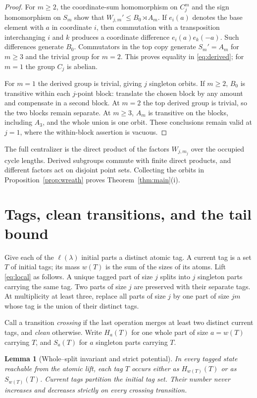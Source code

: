 \documentclass[10pt,a4paper]{amsart}
\newtheorem{lemma}[theorem]{Lemma}
\theoremstyle{definition}
\theoremstyle{remark}
\newcommand{\ellp}{\ell}
\begin{document}
\begin{proof}
For $m\geq2$, the coordinate-sum homomorphism on $C_j^m$ and the sign
homomorphism on $S_m$ show that
$W_{j,m}'\leq B_0\rtimes A_m$.  If $e_i(a)$ denotes the base element with
$a$ in coordinate $i$, then commutation with a transposition interchanging
$i$ and $k$ produces a coordinate difference
$e_i(a)e_k(-a)$.  Such differences generate $B_0$.  Commutators in the top
copy generate $S_m'=A_m$ for $m\geq3$ and the trivial group for $m=2$.
This proves equality in \eqref{eq:derived}; for $m=1$ the group $C_j$ is
abelian.

For $m=1$ the derived group is trivial, giving $j$ singleton orbits.  If
$m\geq2$, $B_0$ is transitive within each $j$-point block: translate the
chosen block by any amount and compensate in a second block.  At $m=2$ the
top derived group is trivial, so the two blocks remain separate.  At
$m\geq3$, $A_m$ is transitive on the blocks, including $A_3$, and the whole
union is one orbit.  These conclusions remain valid at $j=1$, where the
within-block assertion is vacuous.
\end{proof}

The full centralizer is the direct product of the factors $W_{j,m_j}$ over
the occupied cycle lengths.  Derived subgroups commute with finite direct
products, and different factors act on disjoint point sets.  Collecting the
orbits in Proposition~\ref{prop:wreath} proves
Theorem~\ref{thm:main}(i).

\section{Tags, clean transitions, and the tail bound}

Give each of the $\ellp(\lambda)$ initial parts a distinct atomic tag.  A
current tag is a set $T$ of initial tags; its mass $w(T)$ is the sum of the
sizes of its atoms.  Lift \eqref{eq:local} as follows.  A unique tagged part
of size $j$ splits into $j$ singleton parts carrying the same tag.  Two
parts of size $j$ are preserved with their separate tags.  At multiplicity
at least three, replace all parts of size $j$ by one part of size $jm$ whose
tag is the union of their distinct tags.

Call a transition \emph{crossing} if the last operation merges at least two
distinct current tags, and \emph{clean} otherwise.  Write $H_a(T)$ for one
whole part of size $a=w(T)$ carrying $T$, and $S_a(T)$ for $a$ singleton
parts carrying $T$.

\begin{lemma}[Whole--split invariant and strict potential]\label{lem:tag}
In every tagged state reachable from the atomic lift, each tag $T$ occurs
either as $H_{w(T)}(T)$ or as $S_{w(T)}(T)$.  Current tags partition the
initial tag set.  Their number never increases and decreases strictly on
every crossing transition.
\end{lemma}
\end{document}
